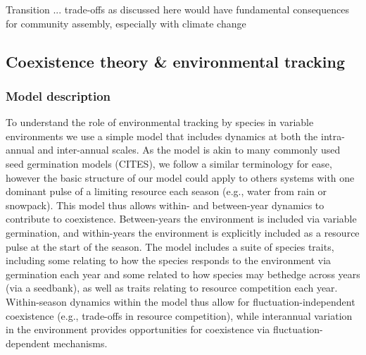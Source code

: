 \documentclass[11pt,letterpaper]{article}
\begin{document}
Transition ... trade-offs as discussed here would have fundamental consequences for community assembly, especially with climate change


\subsection{Coexistence theory \& environmental tracking}


\subsubsection{Model description}

To understand the role of environmental tracking by species in variable environments we use a simple model that includes dynamics at both the intra-annual and inter-annual scales. As the model is akin to many commonly used seed germination models (CITES), we follow a similar terminology for ease, however the basic structure of our model could apply to others systems with one dominant pulse of a limiting resource each season (e.g., water from rain or snowpack).  This model thus allows within- and between-year dynamics to contribute to coexistence. Between-years the environment is included via variable germination, and within-years the environment is explicitly included as a resource pulse at the start of the season. The model includes a suite of species traits, including some relating to how the species responds to the environment via germination each year and some related to how species may bethedge across years (via a seedbank), as well as traits relating to resource competition each year. Within-season dynamics within the model thus allow for fluctuation-independent coexistence (e.g., trade-offs in resource competition), while interannual variation in the environment provides opportunities for coexistence via fluctuation-dependent mechanisms. \\

\end{document}
